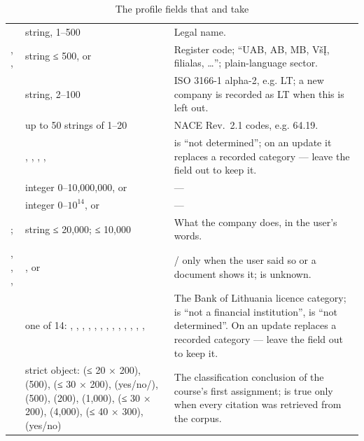 \begin{table}[H]
\caption{The profile fields that  and  take}\label{tab:tools:companyfields}
\begin{tabularx}{\textwidth}{@{}L{39mm}L{43mm}Y@{}}
\toprule
{} &  &  \\
\midrule
{} & string, 1--500 & Legal name. \\
, ,  & string ≤ 500, or  & Register code; \enquote{UAB, AB, MB, VšĮ, filialas, …}; plain-language sector. \\
 & string, 2--100 & ISO 3166-1 alpha-2, e.g. LT; a new company is recorded as LT when this is left out. \\
 & up to 50 strings of 1--20 & NACE Rev.~2.1 codes, e.g. 64.19. \\
 & , , , ,  &  is \enquote{not determined}; on an update it replaces a recorded category --- leave the field out to keep it. \\
 & integer 0--10,000,000, or  & --- \\
 & integer 0--$10^{14}$, or  & --- \\
;  & string ≤ 20,000; ≤ 10,000 & What the company does, in the user's words. \\
, , ,  & ,  or  & / only when the user said so or a document shows it;  is unknown. \\
 & one of 14: , , , , , , , , , , , , ,  & The Bank of Lithuania licence category;  is \enquote{not a financial institution},  is \enquote{not determined}. On an update  replaces a recorded category --- leave the field out to keep it. \\
 & strict object:  (≤ 20 × 200),  (500),  (≤ 30 × 200),  (yes/no/),  (500),  (200),  (1,000),  (≤ 30 × 200),  (4,000),  (≤ 40 × 300),  (yes/no) & The classification conclusion of the course's first assignment;  is true only when every citation was retrieved from the corpus. \\

\end{tabularx}
\end{table}
